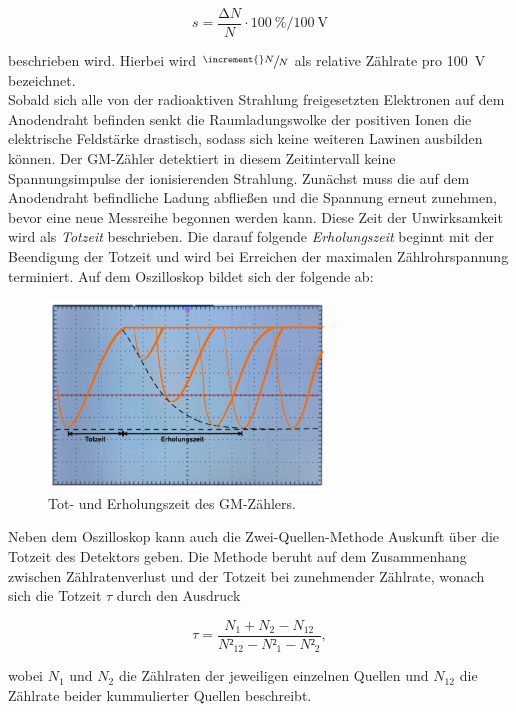 \begin{equation}
\label{eqn:mPlateau}
    s = \frac{\increment{}N}{N}\cdot{}\qty{100}{\percent} / \qty{100}{\volt}
\end{equation}

\noindent beschrieben wird. Hierbei wird $\sfrac{\increment{}N}{N}$ als relative Zählrate pro \qty{100}{\volt} bezeichnet.\\

\noindent Sobald sich alle von der radioaktiven Strahlung freigesetzten Elektronen auf dem Anodendraht befinden senkt die 
Raumladungswolke der positiven Ionen die elektrische Feldstärke drastisch, sodass sich keine weiteren Lawinen ausbilden können.
Der GM-Zähler detektiert in diesem Zeitintervall keine Spannungsimpulse der ionisierenden Strahlung. Zunächst muss die auf dem 
Anodendraht befindliche Ladung abfließen und die Spannung erneut zunehmen, bevor eine neue Messreihe begonnen werden kann. Diese 
Zeit der Unwirksamkeit wird als \emph{Totzeit} beschrieben. Die darauf folgende \emph{Erholungszeit} beginnt mit der 
Beendigung der Totzeit und wird bei Erreichen der maximalen Zählrohrspannung terminiert. Auf dem Oszilloskop bildet sich der 
folgende ab:

\begin{figure}[H]
    \centering
    \includegraphics[height=5cm]{content/Totzeit.png}
    \caption{Tot- und Erholungszeit des GM-Zählers\cite{Versuchsanleitung_v703}.}
    \label{fig:Totzeit}
\end{figure}

\noindent Neben dem Oszilloskop kann auch die Zwei-Quellen-Methode Auskunft über die Totzeit des Detektors geben.
Die Methode beruht auf dem Zusammenhang zwischen Zählratenverlust und der Totzeit bei zunehmender Zählrate, wonach 
sich die Totzeit $\tau$ durch den Ausdruck 

\begin{equation}
\label{eqn:Totzeit}
    \tau = \frac{N_1 + N_2 - N_{12}}{N²_{12} - N²_1 - N²_2},
\end{equation}

\noindent wobei $N_1$ und $N_2$ die Zählraten der jeweiligen einzelnen Quellen und $N_{12}$ die Zählrate beider kummulierter Quellen 
beschreibt.

%
